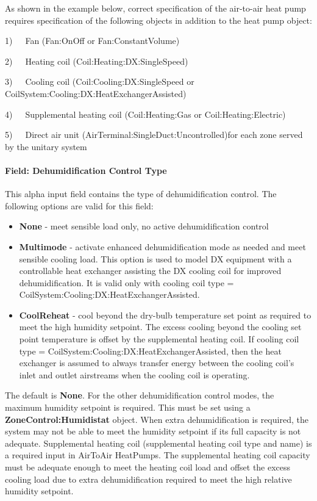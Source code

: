 As shown in the example below, correct specification of the air-to-air heat pump requires specification of the following objects in addition to the heat pump object:

1)~~~Fan (Fan:OnOff or Fan:ConstantVolume)

2)~~~Heating coil (Coil:Heating:DX:SingleSpeed)

3)~~~Cooling coil (Coil:Cooling:DX:SingleSpeed or CoilSystem:Cooling:DX:HeatExchangerAssisted)

4)~~~Supplemental heating coil (Coil:Heating:Gas or Coil:Heating:Electric)

5)~~~Direct air unit (AirTerminal:SingleDuct:Uncontrolled)for each zone served by the unitary system

\paragraph{Field: Dehumidification Control Type}\label{field-dehumidification-control-type-3-000}

This alpha input field contains the type of dehumidification control. The following options are valid for this field:

\begin{itemize}
\item
  \textbf{None} - meet sensible load only, no active dehumidification control
\item
  \textbf{Multimode} - activate enhanced dehumidification mode as needed and meet sensible cooling load. This option is used to model DX equipment with a controllable heat exchanger assisting the DX cooling coil for improved dehumidification. It is valid only with cooling coil type = CoilSystem:Cooling:DX:HeatExchangerAssisted.
\item
  \textbf{CoolReheat} - cool beyond the dry-bulb temperature set point as required to meet the high humidity setpoint. The excess cooling beyond the cooling set point temperature is offset by the supplemental heating coil. If cooling coil type = CoilSystem:Cooling:DX:HeatExchangerAssisted, then the heat exchanger is assumed to always transfer energy between the cooling coil's inlet and outlet airstreams when the cooling coil is operating.
\end{itemize}

The default is \textbf{None}. For the other dehumidification control modes, the maximum humidity setpoint is required. This must be set using a \textbf{ZoneControl:Humidistat} object. When extra dehumidification is required, the system may not be able to meet the humidity setpoint if its full capacity is not adequate. Supplemental heating coil (supplemental heating coil type and name) is a required input in AirToAir HeatPumps. The supplemental heating coil capacity must be adequate enough to meet the heating coil load and offset the excess cooling load due to extra dehumidification required to meet the high relative humidity setpoint.

